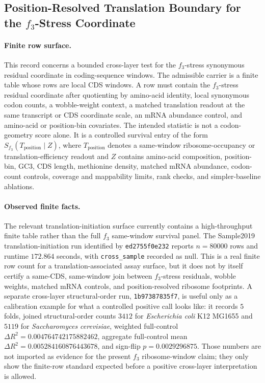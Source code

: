 
\subsection{Position-Resolved Translation Boundary for the $f_3$-Stress Coordinate}
\label{sec:bioreality-f3-stress-position-resolved-translation-boundary}

\paragraph{Finite row surface.}
This record concerns a bounded cross-layer test for the $f_3$-stress synonymous residual coordinate in coding-sequence windows.  The admissible carrier is a finite table whose rows are local CDS windows.  A row must contain the $f_3$-stress residual coordinate after quotienting by amino-acid identity, local synonymous codon counts, a wobble-weight context, a matched translation readout at the same transcript or CDS coordinate scale, an mRNA abundance control, and amino-acid or position-bin covariates.  The intended statistic is not a codon-geometry score alone.  It is a controlled survival entry of the form $S_{f_3}(T_{\mathrm{position}}\mid Z)$, where $T_{\mathrm{position}}$ denotes a same-window ribosome-occupancy or translation-efficiency readout and $Z$ contains amino-acid composition, position-bin, GC3, CDS length, methionine density, matched mRNA abundance, codon-count controls, coverage and mappability limits, rank checks, and simpler-baseline ablations.

\paragraph{Observed finite facts.}
The relevant translation-initiation surface currently contains a high-throughput finite table rather than the full $f_3$ same-window survival panel.  The Sample2019 translation-initiation run identified by \texttt{ed2755f0e232} reports $n=80000$ rows and runtime $172.864$ seconds, with \texttt{cross\_sample} recorded as null.  This is a real finite row count for a translation-associated assay surface, but it does not by itself certify a same-CDS, same-window join between $f_3$-stress residuals, wobble weights, matched mRNA controls, and position-resolved ribosome footprints.  A separate cross-layer structural-order run, \texttt{1b97387835f7}, is useful only as a calibration example for what a controlled positive call looks like: it records $5$ folds, joined structural-order counts $3412$ for \textit{Escherichia coli} K12 MG1655 and $5119$ for \textit{Saccharomyces cerevisiae}, weighted full-control $\Delta R^2=0.004764742175882462$, aggregate full-control mean $\Delta R^2=0.005284160876443678$, and sign-flip $p=0.0029296875$.  Those numbers are not imported as evidence for the present $f_3$ ribosome-window claim; they only show the finite-row standard expected before a positive cross-layer interpretation is allowed.

